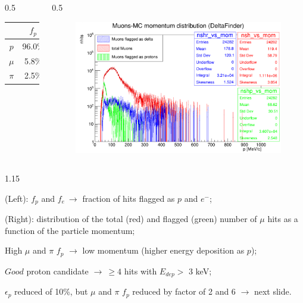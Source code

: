 \documentclass{beamer}
\begin{document}
\begin{frame}
\begin{columns}
\begin{column}{0.5\framewidth}
    \begin{table}[h!]
        \centering
        \renewcommand{\arraystretch}{1.}
        \begin{tabular}{| c | c | c | c | c|} 
        \hline
        &   $f_{p}$ &   $f_{e}$\\
        \hline
        $p$ &  96.0\% & 1.0\% \\
        \hline
        $\mu$ &  5.8\%  & 5.0\%\\
        \hline
        $\pi$ & 2.5\% &  11.2\%\\
        \hline
        \end{tabular}
        \label{tab:0bbpbarbefore}
    \end{table}
        \end{column}
        \begin{column}{0.5\framewidth}
             \begin{figure}[!h]
            \centering
            \includegraphics[width =0.9\columnwidth]{figures/png/Screenshot_20240805_222923.png}
           \label{fig:0pbarbefore}
\end{figure}
        \end{column}
    \end{columns}
    \vspace{-2mm}
    \begin{columns}
        \begin{column}{1.15\framewidth}
    \setlength{\leftmargini}{1.2em}
    \begin{itemize}
      {\small  \item (Left): $f_p$ and $f_e \ \rightarrow$ 
fraction of hits flagged as 
$p$ and $e^-$;
\item (Right): distribution of the total (red) 
        and flagged (green) number of $\mu$ hits as a function of the particle momentum;
\item High $\mu$ and $\pi$ $f_p$ $\rightarrow$ low momentum (higher energy deposition as $p$);
\item $Good$ proton candidate $\rightarrow \ \geq 4$
hits with $E_{dep} >$ 3 keV; 
\item $\epsilon_p$ reduced of 10\%, but $\mu$ and $\pi$ $f_p$ reduced by factor of 2 and 6 $\rightarrow$ next slide.
}
      \end{itemize}
      \end{column}
      \end{columns}
\end{frame}
\end{document}
